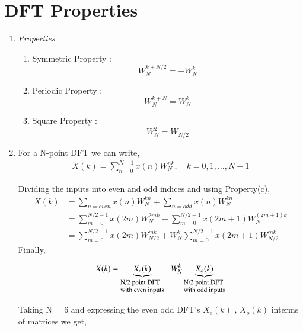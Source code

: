 \documentclass[journal,12pt,twocolumn]{IEEEtran}
\makeatletter
\renewcommand\thesection{\arabic{section}}
\newcommand\myText[1]{\text{\scriptsize\tabular[t]{@{}l@{}}#1\endtabular}}
\makeatother
\begin{document}
\section{DFT Properties}

\begin{enumerate}[label=\thesection.\arabic*.,ref=\thesection.\theenumi]

\item \emph{Properties}
\begin{enumerate}
\item Symmetric Property : \[ W^{k+N/2}_{N} = - W^{k}_{N} \] 
\item Periodic Property : \[ W^{k+N}_{N} =  W^{k}_{N} \] 
\item Square Property : \[ W^{2}_{N} =  W_{N/2} \] 
\end{enumerate}


\item For a N-point DFT we can write,
    \begin{align}
        X(k) = \sum_{n=0}^{N-1} x(n)W^{nk}_{N}, \quad k=0,1, \ldots, N-1
    \end{align}

Dividing the inputs into even and odd indices and using Property(c),
    \begin{align}
       X(k) &= \sum_{n=even} x(n)W^{kn}_{N} + \sum_{n=odd} x(n)W^{kn}_{N} \\
       &= \sum_{m=0}^{N/2 -1} x(2m)W^{2mk}_{N} + \sum_{m=0}^{N/2 -1} x(2m+1)W^{(2m+1)k}_{N} \\
       &= \sum_{m=0}^{N/2 -1} x(2m)W^{mk}_{N/2} + W^{k}_{N} \sum_{m=0}^{N/2 -1} x(2m+1)W^{mk}_{N/2} 
    \end{align}
Finally,

\begin{align}
X(k) = \underbrace{X_{e}(k)}_\myText{ N/2 point DFT \\ with even inputs} + W_{N}^k \underbrace{X_{o}(k)}_\myText{N/2 point DFT \\ with odd inputs}
\label{eq:equation3}
\end{align}        
    
Taking N = 6 and expressing the even odd DFT's $X_{e}(k)$ , $X_{o}(k)$ interms of matrices we get,


\end{enumerate}
\end{document}
